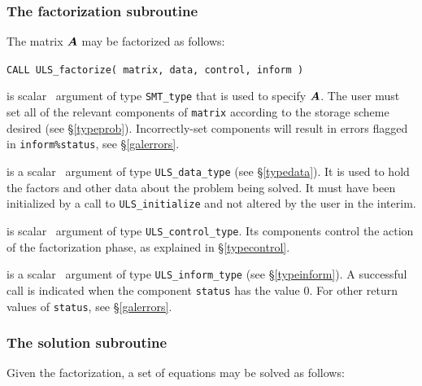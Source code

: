 \documentclass{galahad}
\newcommand{\packagename}{ULS}
\begin{document}

\subsubsection{The factorization subroutine}
The matrix ${\bm{A}}$ may be factorized as follows:

\hskip0.5in
{\tt CALL \packagename\_factorize( matrix, data, control, inform )}

\begin{description}

 is scalar \intentin\ argument of type {\tt SMT\_type}
that is used to specify ${\bm{A}}$.
The user must set all of the relevant components of {\tt matrix} according
to the storage scheme desired (see \S\ref{typeprob}).
Incorrectly-set components will result in errors
flagged in {\tt inform\%status}, see \S\ref{galerrors}.


 is a scalar \intentinout\ argument of type
{\tt \packagename\_data\_type}
(see \S\ref{typedata}). It is used to hold the factors and other
data about the problem being solved.
It must have been initialized by a call to
{\tt \packagename\_ini\-tialize} and not altered by the user in the interim.

 is scalar \intentin\ argument of type
{\tt \packagename\_control\_type}. Its components control the action
of the factorization phase, as explained in
\S\ref{typecontrol}.

 is a scalar \intentinout\ argument of type
{\tt \packagename\_inform\_type}
(see \S\ref{typeinform}).
A successful call is indicated when the  component {\tt status} has the value 0.
For other return values of {\tt status}, see \S\ref{galerrors}.

\end{description}


\subsubsection{The solution subroutine}
Given the factorization, a set of equations may be solved as follows:
\end{document}
